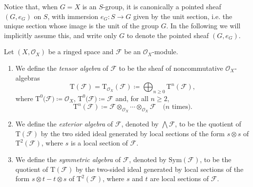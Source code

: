 \begin{rem}[]
	Notice that, when $G = X$ is an $S$-group, it is canonically a
	pointed sheaf $\left(G, e_G\right)$ on $S$, with immersion $e_G\colon S \to G$
	given by the unit section, i.e. the unique section whose image
	is the unit of the group $G$.
	In the following we will implicitly assume this, and write only
	$G$ to denote the pointed sheaf $(G, e_G)$.
\end{rem}


\begin{defn}
	Let $( X , \mathcal{O}_{ X } )$ be a ringed space and $\mathcal{F}$ be an
	$\mathcal{O}_{ X }$-module.
\begin{enumerate}
	\item We define the {\em tensor algebra} of $\mathcal{F}$ to be the sheaf of
		noncommutative $\mathcal{O}_{ X }$-algebras
		\begin{equation*}
			\mathrm{T}(\mathcal{F}) = 
			\mathrm{T}_{\mathcal{O}_{ X }}(\mathcal{F}) \coloneqq
			\bigoplus_{n \geq 0} \mathrm{T}^n(\mathcal{F})
		,\end{equation*}
		where $\mathrm{T}^0(\mathcal{F)} \coloneqq \mathcal{O}_{ X }$,
		$\mathrm{T}^0(\mathcal{F)} \coloneqq \mathcal{F}$ and,
		for all $n \geq 2$,
		\begin{equation*}
			\mathrm{T}^n(\mathcal{F}) \coloneqq 
			\mathcal{F} \otimes_{\mathcal{O}_{ X }} \cdots \otimes_{\mathcal{O}_{ X }}
			\mathcal{F}
			\quad \text{($n$ times)}
		.\end{equation*}
	
	\item We define the {\em exterior algebra} of $\mathcal{F}$, 
		denoted by $\bigwedge \mathcal{F}$, to be the quotient of
		$\mathrm{T}(\mathcal{F})$ by the two sided ideal
		generated by local sections of the form
		$s \otimes s$ of $\mathrm{T}^2(\mathcal{F})$,
		where $s$ is a local section of $\mathcal{F}$.

	\item We define the {\em symmetric algebra} of $\mathcal{F}$,
		denoted by $\mathrm{Sym}(\mathcal{F})$, to be the quotient 
		of $\mathrm{T}(\mathcal{F})$ by the two-sided ideal
		generated by local sections of the form
		$s \otimes t - t \otimes s$ of $\mathrm{T}^2(\mathcal{F})$,
		where $s$ and $t$ are local sections of $\mathcal{F}$.
\end{enumerate}
\end{defn}


